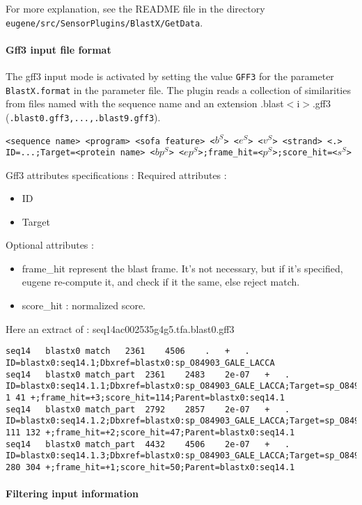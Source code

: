 For more explanation, see the README file in the directory
\texttt{eugene/src/SensorPlugins/BlastX/GetData}.

\paragraph{Gff3 input file format}
The gff3 input mode is activated by setting the value \texttt{GFF3} for the parameter
\texttt{BlastX.format} in the parameter file.
The plugin reads a collection of similarities from files named with
the sequence name and an extension .blast$<$i$>$.gff3 (\texttt{.blast0.gff3,...,.blast9.gff3}).

\texttt{<sequence name> <program> <sofa feature> <$b^S$> <$e^S$> <$v^S$> <strand> <.> ID=...;Target=<protein name> <$bp^S$> <$ep^S$>;frame\_hit=<$p^S$>;score\_hit=<$s^S$>}

Gff3 attributes specifications :
Required attributes : 
	\begin{itemize}
	\item ID
	\item Target
	\end{itemize}
Optional attributes : 
	\begin{itemize}
	\item frame\_hit represent the blast frame. It's not necessary, 
	but if it's specified, eugene re-compute it, and check if it the same, else reject match.
	\item score\_hit :  normalized score.
	\end{itemize}

Here an extract of : seq14ac002535g4g5.tfa.blast0.gff3
\begin{Verbatim}[fontsize=\tiny]
seq14	blastx0	match	2361	4506	.	+	.	ID=blastx0:seq14.1;Dbxref=blastx0:sp_O84903_GALE_LACCA 
seq14	blastx0	match_part	2361	2483	2e-07	+	.	ID=blastx0:seq14.1.1;Dbxref=blastx0:sp_O84903_GALE_LACCA;Target=sp_O84903_GALE_LACCA 1 41 +;frame_hit=+3;score_hit=114;Parent=blastx0:seq14.1 
seq14	blastx0	match_part	2792	2857	2e-07	+	.	ID=blastx0:seq14.1.2;Dbxref=blastx0:sp_O84903_GALE_LACCA;Target=sp_O84903_GALE_LACCA 111 132 +;frame_hit=+2;score_hit=47;Parent=blastx0:seq14.1 
seq14	blastx0	match_part	4432	4506	2e-07	+	.	ID=blastx0:seq14.1.3;Dbxref=blastx0:sp_O84903_GALE_LACCA;Target=sp_O84903_GALE_LACCA 280 304 +;frame_hit=+1;score_hit=50;Parent=blastx0:seq14.1
\end{Verbatim}

\paragraph{Filtering input information}

